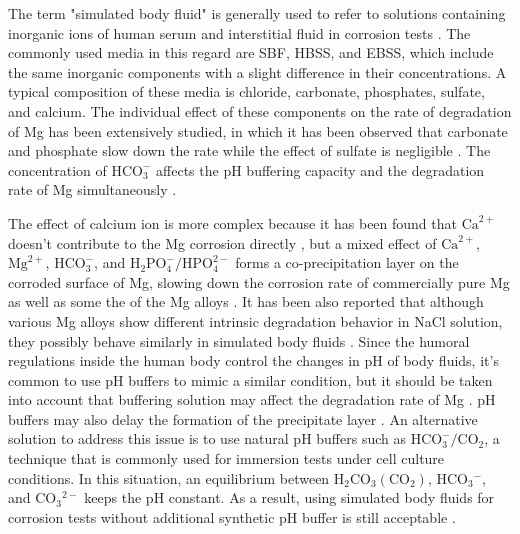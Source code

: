 The term "simulated body fluid" is generally used to refer to solutions containing inorganic ions of human serum and interstitial fluid in corrosion tests \cite{Mei2020}. The commonly used media in this regard are SBF, HBSS, and EBSS, which include the same inorganic components with a slight difference in their concentrations. A typical composition of these media is chloride, carbonate, phosphates, sulfate, and calcium. The individual effect of these components on the rate of degradation of Mg has been extensively studied, in which it has been observed that carbonate and phosphate slow down the rate while the effect of sulfate is negligible \cite{Johnston2017,Mei2019a}. The concentration of $\mathrm{HCO}_{3}^{-}$ affects the pH buffering capacity and the degradation rate of Mg simultaneously \cite{Xin2011}.

The effect of calcium ion is more complex because it has been found that $\mathrm{Ca}^{2+}$ doesn't contribute to the Mg corrosion directly \cite{Willumeit-Roemer2019}, but a mixed effect of $\mathrm{Ca}^{2+}$, $\mathrm{Mg}^{2+}$, $\mathrm{HCO}_{3}^{-}$, and $\mathrm{H}_{2} \mathrm{PO}_{4}^{-} / \mathrm{HPO}_{4}^{2-}$ forms a co-precipitation layer on the corroded surface of Mg, slowing down the corrosion rate of commercially pure Mg as well as some the of the Mg alloys \cite{Mei2019,Lamaka2018}. It has been also reported that although various Mg alloys show different intrinsic degradation behavior in NaCl solution, they possibly behave similarly in simulated body fluids \cite{Agha2016,Mei2019a}. Since the humoral regulations inside the human body control the changes in pH of body fluids, it's common to use pH buffers to mimic a similar condition, but it should be taken into account that buffering solution may affect the degradation rate of Mg \cite{Cui2017,Kannan2017}. pH buffers may also delay the formation of the precipitate layer \cite{Lamaka2018}. An alternative solution to address this issue is to use natural pH buffers such as $\mathrm{HCO}_{3}^{-}/\mathrm{CO}_{2}$, a technique that is commonly used for immersion tests under cell culture conditions. In this situation, an equilibrium between $\mathrm{H}_{2} \mathrm{CO}_{3}\left(\mathrm{CO}_{2}\right)$, $\mathrm{HCO}_{3}{ }^{-}$, and $\mathrm{CO}_{3}{ }^{2-}$ keeps the pH constant. As a result, using simulated body fluids for corrosion tests without additional synthetic pH buffer is still acceptable \cite{Lamaka2018,Mei2019a}.


